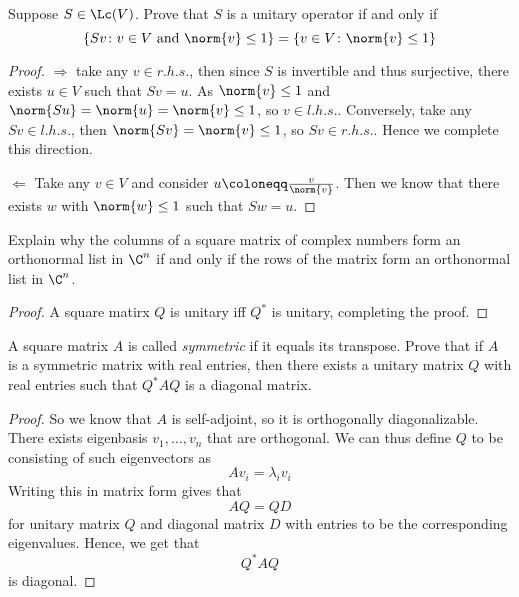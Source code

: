 \documentclass{extarticle}
\begin{document}
\begin{problem}{11}
    Suppose \(S \in \Lc(V)\). Prove that \(S\) is a unitary operator if and only if
    \[\{Sv \colon v \in V \text{ and } \norm{v} \leq 1\} = \{v \in V \colon \norm{v} \leq 1\}\]
\end{problem}

\begin{proof}
\(\Rightarrow\) take any \(v \in r.h.s.\), then since \(S\) is invertible and thus surjective, there exists
\(u \in V\) such that \(Sv = u\). As \(\norm{v} \leq 1\) and \(\norm{Su} = \norm{u} = \norm{v} \leq 1\),
so \(v \in l.h.s.\). Conversely, take any \(Sv \in l.h.s.\), then \(\norm{Sv} = \norm{v} \leq 1\), so
\(Sv \in r.h.s.\). Hence we complete this direction.

\(\Leftarrow\) Take any \(v \in V\) and consider \(u \coloneqq \frac{v}{\norm{v}}\). Then we know that
there exists \(w\) with \(\norm{w} \leq 1\) such that \(Sw = u \).
\end{proof}

\begin{problem}{13}
    Explain why the columns of a square matrix of complex numbers form an orthonormal list in \(\C^n\)
    if and only if the rows of the matrix form an orthonormal list in \(\C^n\).
\end{problem}

\begin{proof}
A square matirx \(Q\) is unitary iff \(Q^*\) is unitary, completing the proof.
\end{proof}

\begin{problem}{18}
    A square matrix \(A\) is called \emph{symmetric} if it equals its transpose. Prove that if
    \(A\) is a symmetric matrix with real entries, then there exists a unitary matrix \(Q\) with
    real entries such that \(Q^* A Q\) is a diagonal matrix.
\end{problem}

\begin{proof}
So we know that \(A\) is self-adjoint, so it is orthogonally diagonalizable. There exists eigenbasis
\(v_1, \ldots, v_n\) that are orthogonal. We can thus define \(Q\) to be consisting of such eigenvectors
as
\[Av_i = \lambda_i v_i\]
Writing this in matrix form gives that
\[AQ = QD\]
for unitary matrix \(Q\) and diagonal matrix \(D\) with entries to be the corresponding eigenvalues.
Hence, we get that
\[Q^*AQ\]
is diagonal.
\end{proof}
\end{document}
